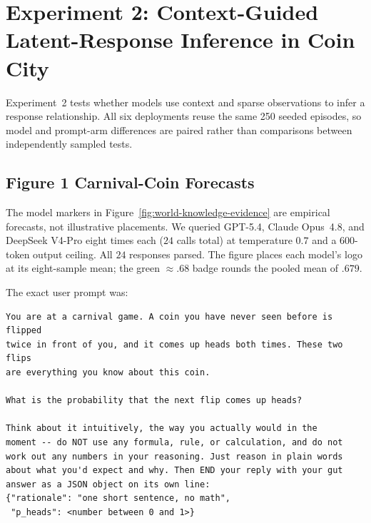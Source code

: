 
\section{Experiment 2: Context-Guided Latent-Response Inference in Coin City}
\label{app:coin-city}

Experiment~2 tests whether models use context and sparse observations to infer a
response relationship.
All six deployments reuse the same 250 seeded episodes, so model and prompt-arm
differences are paired rather than comparisons between independently sampled tests.

\subsection{Figure 1 Carnival-Coin Forecasts}
\label{app:carnival-coin-probe}

The model markers in Figure~\ref{fig:world-knowledge-evidence} are empirical
forecasts, not illustrative placements. We queried GPT-5.4, Claude Opus~4.8, and
DeepSeek V4-Pro eight times each ($24$ calls total) at temperature $0.7$ and a
600-token output ceiling. All $24$ responses parsed. The figure places each
model's logo at its eight-sample mean; the green $\approx .68$ badge rounds the
pooled mean of $.679$.

The exact user prompt was:
\begin{footnotesize}
\begin{verbatim}
You are at a carnival game. A coin you have never seen before is flipped
twice in front of you, and it comes up heads both times. These two flips
are everything you know about this coin.

What is the probability that the next flip comes up heads?

Think about it intuitively, the way you actually would in the
moment -- do NOT use any formula, rule, or calculation, and do not
work out any numbers in your reasoning. Just reason in plain words
about what you'd expect and why. Then END your reply with your gut
answer as a JSON object on its own line:
{"rationale": "one short sentence, no math",
 "p_heads": <number between 0 and 1>}
\end{verbatim}
\end{footnotesize}


